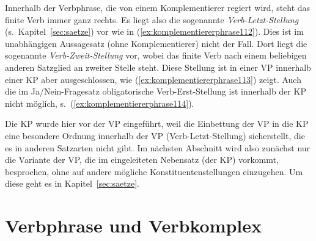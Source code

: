 
Innerhalb der Verbphrase, die von einem Komplementierer regiert wird, steht das finite Verb immer ganz rechts.
Es liegt also die sogenannte \textit{Verb-Letzt-Stellung} (s.\ Kapitel~\ref{sec:saetze}) vor wie in (\ref{ex:komplementiererphrase112}).
Dies ist im unabhängigen Aussagesatz (ohne Komplementierer) nicht der Fall.
Dort liegt die sogenannte \textit{Verb-Zweit-Stellung} vor, wobei das finite Verb nach einem beliebigen anderen Satzglied an zweiter Stelle steht.
Diese Stellung ist in einer VP innerhalb einer KP aber ausgeschlossen, wie (\ref{ex:komplementiererphrase113}) zeigt.
Auch die im Ja\slash Nein-Fragesatz obligatorische Verb-Erst-Stellung ist innerhalb der KP nicht möglich, s.\ (\ref{ex:komplementiererphrase114}).

\Stretch[0.5]

\begin{exe}
  \ex\label{ex:komplementiererphrase111}
  \begin{xlist}
  \end{xlist}
\end{exe}

\Stretch[0.5]

Die KP wurde hier vor der VP eingeführt, weil die Einbettung der VP in die KP eine besondere Ordnung innerhalb der VP (Verb-Letzt-Stellung) sicherstellt, die es in anderen Satzarten nicht gibt.
Im nächsten Abschnitt wird also zunächst nur die Variante der VP, die im eingeleiteten Nebensatz (der KP) vorkommt, besprochen, ohne auf andere mögliche Konstituentenstellungen einzugehen.
Um diese geht es in Kapitel~\ref{sec:saetze}.

\Np


\section{Verbphrase und Verbkomplex}
\label{sec:verbphraseundverbkomplex}


